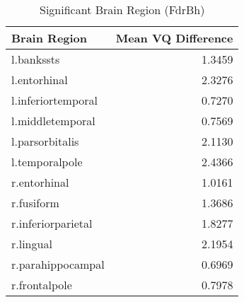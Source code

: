 \begin{table}
\caption{Significant Brain Region (FdrBh)}
\label{tab:significant_VQ_FdrBh}
\begin{tabular}{lr}
\toprule
Brain Region & Mean VQ Difference \\
\midrule
l.bankssts & 1.3459 \\
l.entorhinal & 2.3276 \\
l.inferiortemporal & 0.7270 \\
l.middletemporal & 0.7569 \\
l.parsorbitalis & 2.1130 \\
l.temporalpole & 2.4366 \\
r.entorhinal & 1.0161 \\
r.fusiform & 1.3686 \\
r.inferiorparietal & 1.8277 \\
r.lingual & 2.1954 \\
r.parahippocampal & 0.6969 \\
r.frontalpole & 0.7978 \\
\bottomrule
\end{tabular}
\end{table}
